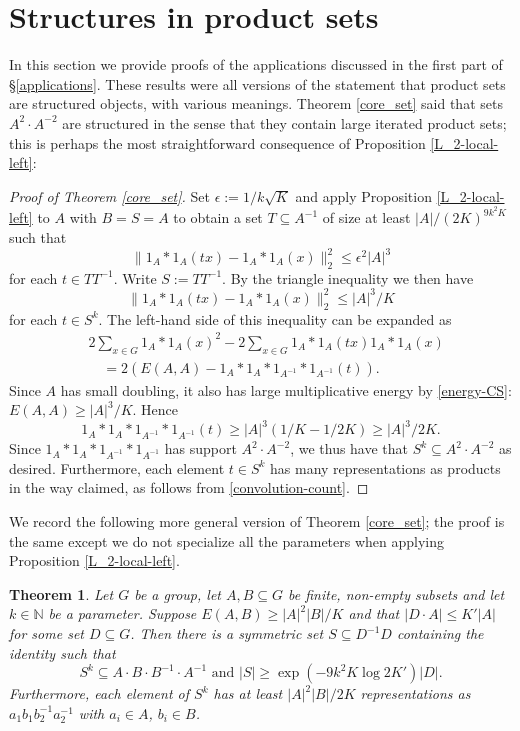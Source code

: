 \documentclass[12pt,a4paper,reqno]{amsart}
\numberwithin{equation}{section}
\theoremstyle{plain}
\newtheorem{theorem}{Theorem}[section]
\theoremstyle{definition}
\renewcommand{\leq}{\leqslant}
\renewcommand{\geq}{\geqslant}
\renewcommand{\subset}{\subseteq}
\def\N{\mathbb{N}}
\providecommand{\norm}[1]{\lVert#1\rVert}
\begin{document}
\section{Structures in product sets}\label{non-abelian}
In this section we provide proofs of the applications discussed in the first part of \S\ref{applications}. These results were all versions of the statement that product sets are structured objects, with various meanings. 
Theorem \ref{core_set} said that sets $A^2 \cdot A^{-2}$ are structured in the sense that they contain large iterated product sets; this is perhaps the most straightforward consequence of Proposition \ref{L_2-local-left}: 

\begin{proof}[Proof of Theorem \ref{core_set}]
Set $\epsilon := 1/k\sqrt{K}$ and apply Proposition \ref{L_2-local-left} to $A$ with $B=S=A$ to obtain a set $T \subset A^{-1}$ of size at least $|A|/(2K)^{9k^2K}$ such that 
\[ \norm{ 1_A*1_A(tx) - 1_A*1_A(x) }_2^2 \leq \epsilon^2 |A|^3 \]
for each $t \in TT^{-1}$. Write $S := TT^{-1}$. By the triangle inequality we then have 
\[ \norm{ 1_A*1_A(tx) - 1_A*1_A(x) }_2^2 \leq |A|^3/K \]
for each $t \in S^k$. The left-hand side of this inequality can be expanded as
\begin{align*}
&2 \sum_{x \in G} 1_A*1_A(x)^2 - 2\sum_{x \in G} 1_A*1_A(tx)1_A*1_A(x) \\
&\quad = 2\left( E(A,A) - 1_A*1_A*1_{A^{-1}}*1_{A^{-1}}(t) \right).
\end{align*}
Since $A$ has small doubling, it also has large multiplicative energy by \eqref{energy-CS}: $E(A,A) \geq |A|^3/K$. Hence 
\[ 1_A*1_A*1_{A^{-1}}*1_{A^{-1}}(t) \geq |A|^3 \left(1/K - 1/2K\right) \geq |A|^3/2K. \]
Since $1_A*1_A*1_{A^{-1}}*1_{A^{-1}}$ has support $A^2 \cdot A^{-2}$, we thus have that $S^k \subset A^2 \cdot A^{-2}$ as desired. Furthermore, each element $t \in S^k$ has many representations as products in the way claimed, as follows from \eqref{convolution-count}.
\end{proof}

We record the following more general version of Theorem \ref{core_set}; the proof is the same except we do not specialize all the parameters when applying Proposition \ref{L_2-local-left}.

\begin{theorem}\label{ABBA}
Let $G$ be a group, let $A, B \subset G$ be finite, non-empty subsets and let $k \in \N$ be a parameter. Suppose $E(A,B) \geq |A|^2|B|/K$ and that $|D \cdot A| \leq K'|A|$ for some set $D \subset G$. Then there is a symmetric set $S \subset D^{-1} D$ containing the identity such that 
\[ S^k \subset A\cdot B \cdot B^{-1} \cdot A^{-1} \text{ and }  |S| \geq \exp\left(-9k^2 K \log{2K'} \right) |D|. \]
Furthermore, each element of $S^k$ has at least $|A|^2 |B|/2K$ representations as $a_1 b_1 b_2^{-1} a_2^{-1}$ with $a_i \in A$, $b_i \in B$.
\end{theorem}
\end{document}
